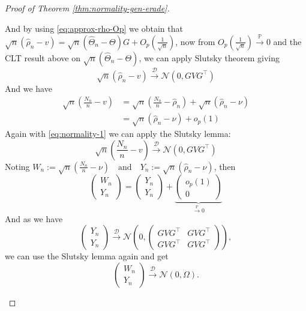 \begin{proof}[Proof of Theorem \ref{thm:normality-gen-erade}]
\begin{enumerate}[label=(\roman*)]
		And by using \eqref{eq:approx-rho-Op} we obtain that \(\sqrt{n} (\hat{\rho}_n - v) = \sqrt{n} (\hat{\Theta}_n - \Theta) G + O_p\!\left(\frac{1}{\sqrt{n}}\right)\), now from \(O_p\!\left(\frac{1}{\sqrt{n}}\right) \xrightarrow{\mathbb{P}} 0\) and the CLT result above on \(\sqrt n(\hat\Theta_n-\Theta)\), we can apply Slutsky theorem giving
		\begin{equation}\label{eq:normality-1}
			\sqrt{n} (\hat{\rho}_n - v) \xrightarrow{\mathcal{D}} \mathcal{N}(0, GVG^{\top})
		\end{equation}
		And we have
		\begin{align*}
			\sqrt{n} \left( \frac{N_n}{n} - v \right) 
			&= \sqrt{n} \left( \frac{N_n}{n} - \hat{\rho}_n \right)
			+ \sqrt{n} (\hat{\rho}_n - \nu)\\
			&= \sqrt{n} (\hat{\rho}_n - \nu) + o_p(1)
		\end{align*}
		Again with \eqref{eq:normality-1} we can apply the Slutsky lemma:
		\[
		\sqrt{n} \left( \frac{N_n}{n} - v \right) \xrightarrow{\mathcal{D}} \mathcal{N}(0,GVG^{\top})
		\]
		Noting \(W_n := \sqrt{n} \left( \frac{N_n}{n} - \nu \right) 
		\quad \text{and} \quad Y_n := \sqrt{n} (\hat{\rho}_n - \nu)\), then
		\[
		\begin{pmatrix}
			W_n \\
			Y_n
		\end{pmatrix}
		=
		\begin{pmatrix}
			Y_n \\
			Y_n
		\end{pmatrix}
		+
		\underbrace{\begin{pmatrix}
				o_p(1) \\
				0
		\end{pmatrix}}_{\xrightarrow{\mathbb{P}} 0}
		\]
		And as we have
		\[
		\begin{pmatrix}
			Y_n \\
			Y_n
		\end{pmatrix}
		\xrightarrow{\mathcal{D}} 
		\mathcal{N}\left(0,\begin{pmatrix}
			GVG^{\top} & GVG^{\top} \\
			GVG^{\top} & GVG^{\top}
		\end{pmatrix}
		\right),
		\]
		we can use the Slutsky lemma again and get
		\[
		\begin{pmatrix}
			W_n \\
			Y_n
		\end{pmatrix}
		\xrightarrow{\mathcal{D}} \mathcal{N}(0,\Omega).
		\]
	\end{enumerate}	
\end{proof}

